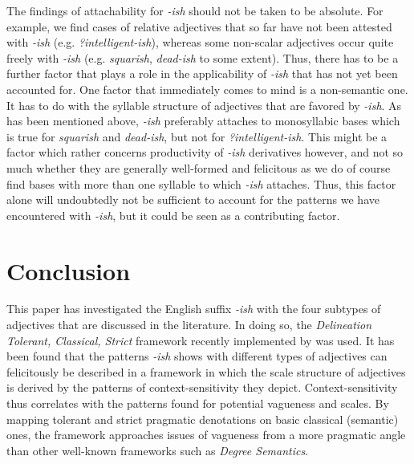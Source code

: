 \documentclass[output=paper]{langsci/langscibook}
\begin{document}
The findings of attachability for \textit{-ish} should not be taken to be absolute. For example, we find cases of relative adjectives that so far have not been attested with \textit{-ish} (e.g. \textit{?intelligent-ish}), whereas some non-scalar adjectives occur quite freely with \textit{-ish} (e.g. \textit{squarish}, \textit{dead-ish} to some extent). Thus, there has to be a further factor that plays a role in the applicability of \textit{-ish} that has not yet been accounted for. One factor that immediately comes to mind is a non-semantic one. It has to do with the syllable structure of adjectives that are favored by \textit{-ish}. As has been mentioned above, \textit{-ish} preferably attaches to monosyllabic bases which is true for \textit{squarish} and \textit{dead-ish}, but not for \textit{?intelligent-ish}. This might be a factor which rather concerns productivity of \textit{-ish} derivatives however, and not so much whether they are generally well-formed and felicitous as we do of course find bases with more than one syllable to which \textit{-ish} attaches. Thus, this factor alone will undoubtedly not be sufficient to account for the patterns we have encountered with \textit{-ish}, but it could be seen as a contributing factor.

\section{Conclusion}
\label{sec:summary}

This paper has investigated the English suffix \textit{-ish} with the four subtypes of adjectives that are discussed in the literature. In doing so, the \textit{Delineation Tolerant, Classical, Strict} framework recently implemented by \citet{Burnett2017} was used. It has been found that the patterns \textit{-ish} shows with different types of adjectives can felicitously be described in a framework in which the scale structure of adjectives is derived by the patterns of context-sensitivity they depict. Context-sensitivity thus correlates with the patterns found for potential vagueness and scales. By mapping tolerant and strict pragmatic denotations on basic classical (semantic) ones, the framework approaches issues of vagueness from a more pragmatic angle than other well-known frameworks such as \textit{Degree Semantics}.
\end{document}
